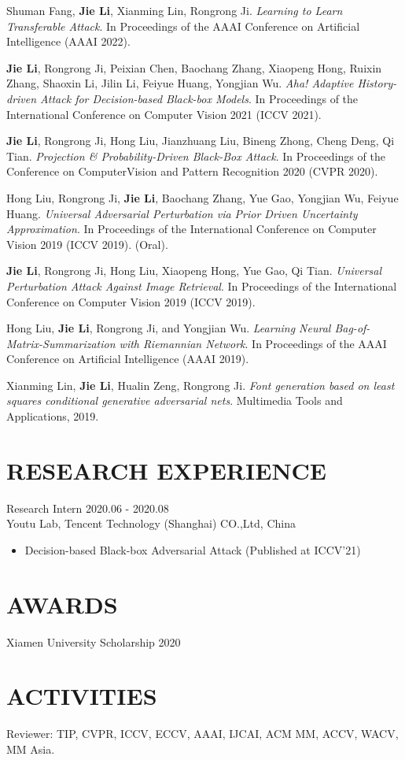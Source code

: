 \documentclass[margin, 10pt]{res} %
\begin{document}
\begin{resume}
Shuman Fang, \textbf{Jie Li}, Xianming Lin, Rongrong Ji. \textit{Learning to Learn Transferable Attack}.
In Proceedings of the AAAI Conference on Artificial Intelligence (AAAI 2022).

\textbf{Jie Li}, Rongrong Ji, Peixian Chen, Baochang Zhang, Xiaopeng Hong, Ruixin Zhang, Shaoxin Li, Jilin Li, Feiyue Huang, Yongjian Wu. \textit{Aha! Adaptive History-driven Attack for Decision-based Black-box Models}.
In Proceedings of the International Conference on Computer Vision 2021 (ICCV 2021).

\textbf{Jie Li}, Rongrong Ji, Hong Liu, Jianzhuang Liu, Bineng Zhong, Cheng Deng, Qi Tian. \textit{Projection \& Probability-Driven Black-Box Attack}.
In Proceedings of the Conference on ComputerVision and Pattern Recognition 2020 (CVPR 2020).

Hong Liu, Rongrong Ji, \textbf{Jie Li}, Baochang Zhang, Yue Gao, Yongjian Wu, Feiyue Huang. \textit{Universal Adversarial Perturbation via Prior Driven Uncertainty Approximation}.
In Proceedings of the International Conference on Computer Vision 2019 (ICCV 2019). (Oral).

\textbf{Jie Li}, Rongrong Ji, Hong Liu, Xiaopeng Hong, Yue Gao, Qi Tian. \textit{Universal Perturbation Attack Against Image Retrieval}.
In Proceedings of the International Conference on Computer Vision 2019 (ICCV 2019).

Hong Liu, \textbf{Jie Li}, Rongrong Ji, and Yongjian Wu. \textit{Learning Neural Bag-of-Matrix-Summarization with Riemannian Network}.
In Proceedings of the AAAI Conference on Artificial Intelligence (AAAI 2019).

Xianming Lin, \textbf{Jie Li}, Hualin Zeng, Rongrong Ji. \textit{Font generation based on least squares conditional generative adversarial nets}.
Multimedia Tools and Applications, 2019.

\section{RESEARCH EXPERIENCE}
Research Intern \hfill 2020.06 - 2020.08 \\
Youtu Lab, Tencent Technology (Shanghai) CO.,Ltd, China
\begin{itemize}
    \item Decision-based Black-box Adversarial Attack (Published at ICCV'21)
\end{itemize}

\section{AWARDS}
Xiamen University Scholarship \hfill 2020

\section{ACTIVITIES}
Reviewer: TIP, CVPR, ICCV, ECCV, AAAI, IJCAI, ACM MM, ACCV, WACV, MM Asia.

\end{resume}
\end{document}

